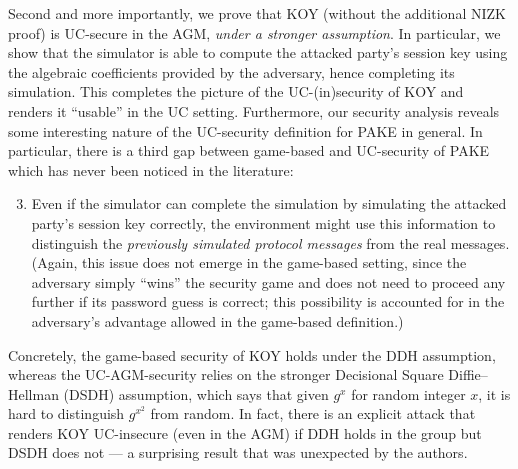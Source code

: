 Second and more importantly, we prove that KOY (without the additional NIZK proof) is UC-secure in the AGM, \emph{under a stronger assumption}. In particular, we show that the simulator is able to compute the attacked party's session key using the algebraic coefficients provided by the adversary, hence completing its simulation. This completes the picture of the UC-(in)security of KOY and renders it ``usable'' in the UC setting. Furthermore, our security analysis reveals some interesting nature of the UC-security definition for PAKE in general. In particular, there is a third gap between game-based and UC-security of PAKE which has never been noticed in the literature:
\begin{enumerate}\setcounter{enumi}{2}
  \item Even if the simulator can complete the simulation by simulating the attacked party's session key correctly, the environment might use this information to distinguish the \emph{previously simulated protocol messages} from the real messages. (Again, this issue does not emerge in the game-based setting, since the adversary simply ``wins'' the security game and does not need to proceed any further if its password guess is correct; this possibility is accounted for in the adversary's advantage allowed in the game-based definition.)
\end{enumerate}
Concretely, the game-based security of KOY holds under the DDH assumption, whereas the UC-AGM-security relies on the stronger Decisional Square Diffie--Hellman (DSDH) assumption, which says that given $g^x$ for random integer $x$, it is hard to distinguish $g^{x^2}$ from random. In fact, there is an explicit attack that renders KOY UC-insecure (even in the AGM) if DDH holds in the group but DSDH does not --- a surprising result that was unexpected by the authors.

